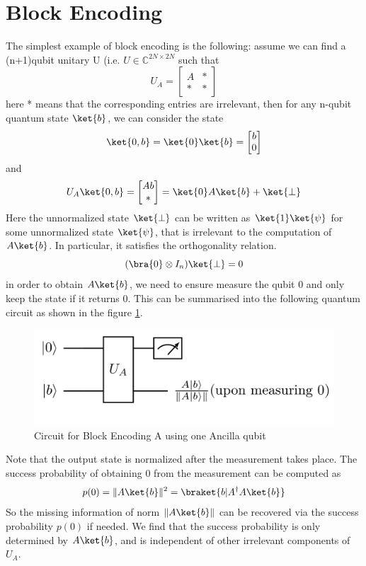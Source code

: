 \documentclass[12pt, oneside]{book}
\theoremstyle{definition}
\theoremstyle{definition}
\theoremstyle{remark}
\begin{document}
\section{Block Encoding}
The simplest example of block encoding is the following: assume we can find a (n+1)qubit unitary U (i.e. $U\in\mathbb{C}^{2N \times 2N}$ such that
\[
U_A=\begin{bmatrix}A & * \\ * & * \end{bmatrix}
\]
here * means that the corresponding entries are irrelevant, then for any n-qubit quantum state $\ket{b}$, we can consider the state
\[
\ket{0,b}=\ket{0}\ket{b}=\begin{bmatrix}b \\ 0 \end{bmatrix}
\]
and
\[
U_A\ket{0,b}=\begin{bmatrix}Ab\\ * \end{bmatrix}=\ket{0}A\ket{b}+\ket{\perp}
\]
Here the unnormalized state $\ket{\perp}$ can be written as $\ket{1}\ket{\psi}$ for some unnormalized state $\ket{\psi}$, that is irrelevant to the computation of $A\ket{b}$. In particular, it satisfies the orthogonality relation.
\[
(\bra{0}\otimes I_n)\ket{\perp}=0
\]
in order to obtain $A\ket{b}$, we need to ensure measure the qubit 0 and only keep the state if it returns 0. This can be summarised into the following quantum circuit as shown in the figure \ref{fig:blockencodingcircuit}.
\begin{figure}
    \centering
    \includegraphics[width=1\linewidth]{../images/blockencodingcircuit.png}
    \caption{Circuit for Block Encoding A using one Ancilla qubit}
    \label{fig:blockencodingcircuit}
\end{figure}
Note that the output state is normalized after the measurement takes place. The success probability of obtaining 0 from the measurement can be computed as
\[
p(0)=\|A\ket{b}\|^2=\braket{b|A^{\dagger}A\ket{b}}
\]
So the missing information of norm $\|A\ket{b}\|$ can be recovered via the success probability $p(0)$ if needed. We find that the success probability is only determined by $A\ket{b}$, and is independent of other irrelevant components of $U_A$.
\end{document}

